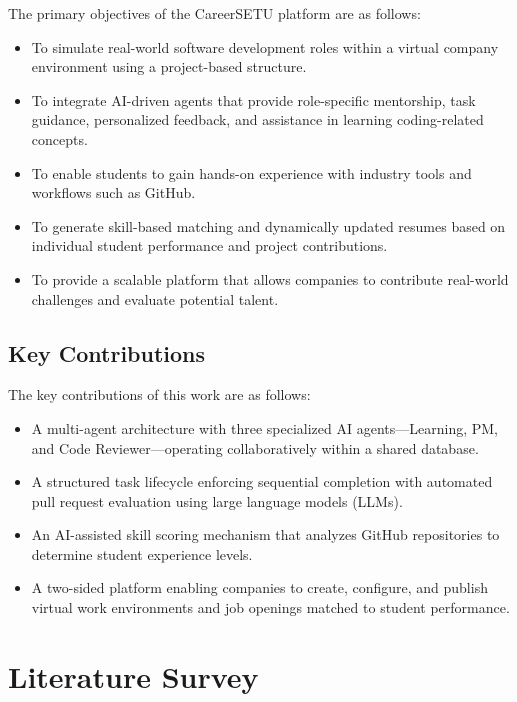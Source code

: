 \documentclass[12pt,a4paper]{report}
\begin{document}
The primary objectives of the CareerSETU platform are as follows:

\begin{itemize}
    \item To simulate real-world software development roles within a virtual company environment using a project-based structure.
    \item To integrate AI-driven agents that provide role-specific mentorship, task guidance, personalized feedback, and assistance in learning coding-related concepts.
    \item To enable students to gain hands-on experience with industry tools and workflows such as GitHub.
    \item To generate skill-based matching and dynamically updated resumes based on individual student performance and project contributions.
    \item To provide a scalable platform that allows companies to contribute real-world challenges and evaluate potential talent.
\end{itemize}


\section{Key Contributions}

The key contributions of this work are as follows:
\begin{itemize}
    \item A multi-agent architecture with three specialized AI agents---Learning, PM, and Code Reviewer---operating collaboratively within a shared database.
    \item A structured task lifecycle enforcing sequential completion with automated pull request evaluation using large language models (LLMs).
    \item An AI-assisted skill scoring mechanism that analyzes GitHub repositories to determine student experience levels.
    \item A two-sided platform enabling companies to create, configure, and publish virtual work environments and job openings matched to student performance.
\end{itemize}


\chapter{Literature Survey}
\end{document}
